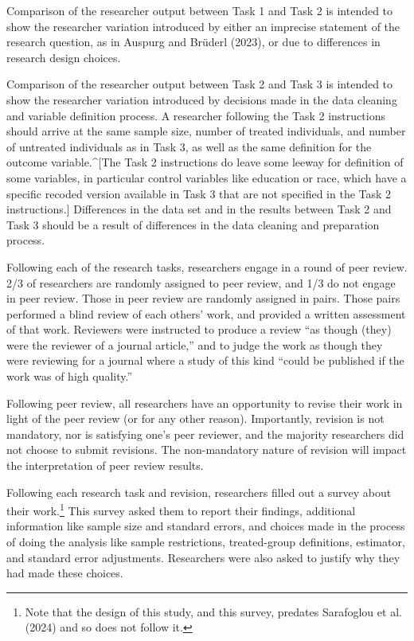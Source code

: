 \documentclass[
  letterpaper,
  DIV=11,
  numbers=noendperiod]{scrartcl}
\begin{document}
Comparison of the researcher output between Task 1 and Task 2 is
intended to show the researcher variation introduced by either an
imprecise statement of the research question, as in Auspurg and Brüderl
(2023), or due to differences in research design choices.

Comparison of the researcher output between Task 2 and Task 3 is
intended to show the researcher variation introduced by decisions made
in the data cleaning and variable definition process. A researcher
following the Task 2 instructions should arrive at the same sample size,
number of treated individuals, and number of untreated individuals as in
Task 3, as well as the same definition for the outcome
variable.\^{}{[}The Task 2 instructions do leave some leeway for
definition of some variables, in particular control variables like
education or race, which have a specific recoded version available in
Task 3 that are not specified in the Task 2 instructions.{]} Differences
in the data set and in the results between Task 2 and Task 3 should be a
result of differences in the data cleaning and preparation process.

Following each of the research tasks, researchers engage in a round of
peer review. 2/3 of researchers are randomly assigned to peer review,
and 1/3 do not engage in peer review. Those in peer review are randomly
assigned in pairs. Those pairs performed a blind review of each others'
work, and provided a written assessment of that work. Reviewers were
instructed to produce a review ``as though (they) were the reviewer of a
journal article,'' and to judge the work as though they were reviewing
for a journal where a study of this kind ``could be published if the
work was of high quality.''

Following peer review, all researchers have an opportunity to revise
their work in light of the peer review (or for any other reason).
Importantly, revision is not mandatory, nor is satisfying one's peer
reviewer, and the majority researchers did not choose to submit
revisions. The non-mandatory nature of revision will impact the
interpretation of peer review results.

Following each research task and revision, researchers filled out a
survey about their work.\footnote{Note that the design of this study,
  and this survey, predates Sarafoglou et al. (2024) and so does not
  follow it.} This survey asked them to report their findings,
additional information like sample size and standard errors, and choices
made in the process of doing the analysis like sample restrictions,
treated-group definitions, estimator, and standard error adjustments.
Researchers were also asked to justify why they had made these choices.
\end{document}
